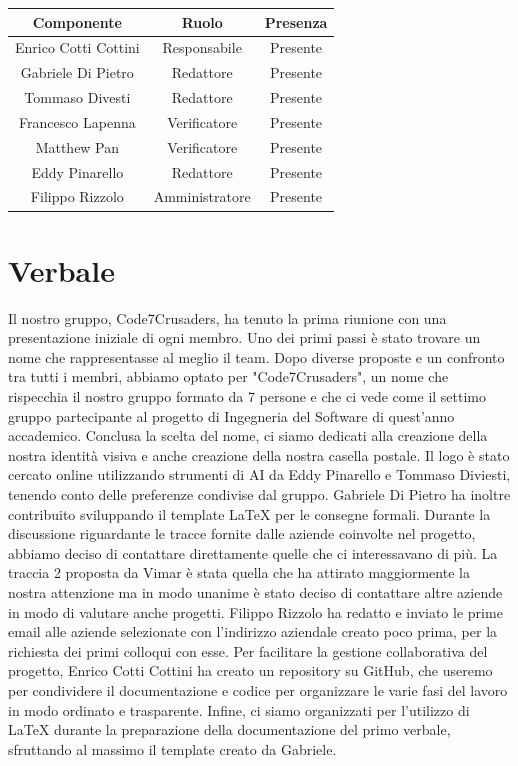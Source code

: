 \documentclass{article}
\begin{document}
\begin{tabular}{|c|c|c|}
    \hline
    \textbf{Componente} & \textbf{Ruolo} & \textbf{Presenza}\\
    \hline
    Enrico Cotti Cottini & Responsabile & Presente \\ 
    \hline
    Gabriele Di Pietro & Redattore & Presente \\ 
    \hline
    Tommaso Divesti & Redattore & Presente \\ 
    \hline %
    Francesco Lapenna & Verificatore & Presente \\ 
    \hline
    Matthew Pan & Verificatore & Presente \\ 
    \hline %
    Eddy Pinarello & Redattore & Presente \\ 
    \hline %
    Filippo Rizzolo & Amministratore & Presente \\ 
    \hline %
\end{tabular}

\newpage
\section{Verbale}

\label{sec:verbale}
{\Large
Il nostro gruppo, Code7Crusaders, ha tenuto la prima riunione con una presentazione iniziale di ogni membro. Uno dei primi passi è stato trovare un nome che rappresentasse al meglio il team. Dopo diverse proposte e un confronto tra tutti i membri, abbiamo optato per "Code7Crusaders", un nome che rispecchia il nostro gruppo formato da 7 persone e che ci vede come il settimo gruppo partecipante al progetto di Ingegneria del Software di quest’anno accademico.\newline
Conclusa la scelta del nome, ci siamo dedicati alla creazione della nostra identità visiva e anche creazione della nostra casella postale. Il logo è stato cercato online utilizzando strumenti di AI da Eddy Pinarello e Tommaso Diviesti, tenendo conto delle preferenze condivise dal gruppo. Gabriele Di Pietro ha inoltre contribuito sviluppando il template LaTeX per le consegne formali.\newline
Durante la discussione riguardante le tracce fornite dalle aziende coinvolte nel progetto, abbiamo deciso di contattare direttamente quelle che ci interessavano di più. La traccia 2 proposta da Vimar è stata quella che ha attirato maggiormente la nostra attenzione ma in modo unanime è stato deciso di contattare altre aziende in modo di valutare anche progetti. Filippo Rizzolo ha redatto e inviato le prime email alle aziende selezionate con l'indirizzo aziendale creato poco prima, per la richiesta dei primi colloqui con esse.\newline
Per facilitare la gestione collaborativa del progetto, Enrico Cotti Cottini ha creato un repository su GitHub, che useremo per condividere il documentazione e codice per organizzare le varie fasi del lavoro in modo ordinato e trasparente. \newline
Infine, ci siamo organizzati per l'utilizzo di LaTeX durante la preparazione della documentazione del primo verbale, sfruttando al massimo il template creato da Gabriele.}
\end{document}

